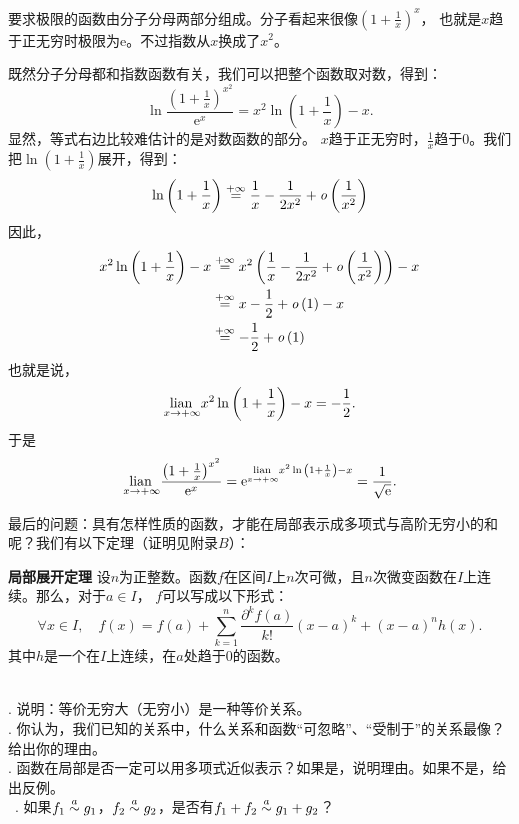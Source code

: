 \documentclass[12pt,UTF8]{ctexbook}
\begin{document}
\begin{so}
    要求极限的函数由分子分母两部分组成。分子看起来很像$\left(1 + \frac{1}{x}\right)^{x}$，
    也就是$x$趋于正无穷时极限为$\mathrm{e}$。不过指数从$x$换成了$x^2$。

    既然分子分母都和指数函数有关，我们可以把整个函数取对数，得到：
    $$ \ln{\frac{\left(1 + \frac{1}{x}\right)^{x^2}}{\mathrm{e}^x}} = x^2 \ln{\left(1 + \frac{1}{x}\right)} - x.$$
    显然，等式右边比较难估计的是对数函数的部分。
    $x$趋于正无穷时，$\frac{1}{x}$趋于$0$。我们把$\ln{\left(1 + \frac{1}{x}\right)}$展开，得到：
    $$ \ln{\left(1 + \frac{1}{x}\right)} \overset{+\infty}{=} \frac{1}{x} - \frac{1}{2x^2} + \mathit{o}\left(\frac{1}{x^2}\right)$$
    因此，
    \begin{align*}
        x^2 \ln{\left(1 + \frac{1}{x}\right)} - x &\overset{+\infty}{=} x^2 \left(\frac{1}{x} - \frac{1}{2x^2} + \mathit{o}\left(\frac{1}{x^2}\right)\right) - x  \\
        &\overset{+\infty}{=} x -\frac{1}{2} + \mathit{o}\left(1\right) - x  \\
        &\overset{+\infty}{=} -\frac{1}{2} + \mathit{o}\left(1\right) 
    \end{align*}
    也就是说，
    $$ \underset{x\to +\infty}{\operatorname{lian}\,} x^2 \ln{\left(1 + \frac{1}{x}\right)} - x = -\frac{1}{2}. $$
    于是
    $$ \underset{x\to +\infty}{\operatorname{lian}\,} \frac{\left(1 + \frac{1}{x}\right)^{x^2}}{\mathrm{e}^x} = \mathrm{e}^{\underset{x\to +\infty}{\operatorname{lian}\,}  x^2 \ln{\left(1 + \frac{1}{x}\right)} - x} = \frac{1}{\sqrt{\mathrm{e}}}. $$
\end{so}

最后的问题：具有怎样性质的函数，才能在局部表示成多项式与高阶无穷小的和呢？我们有以下定理（证明见附录$B$）：
\begin{tm}{\textbf{局部展开定理}}
    设$n$为正整数。函数$f$在区间$I$上$n$次可微，且$n$次微变函数在$I$上连续。那么，对于$a\in I$，
    $f$可以写成以下形式：
    $$ \forall x \in I , \quad f(x) = f(a) + \sum_{k=1}^n \frac{\partial^k f (a)}{k!}(x - a)^k + (x - a)^n h(x). $$
    其中$h$是一个在$I$上连续，在$a$处趋于$0$的函数。
\end{tm}

\begin{sk}
    \mbox{} \\
    . 说明：等价无穷大（无穷小）是一种等价关系。\\
    . 你认为，我们已知的关系中，什么关系和函数“可忽略”、“受制于”的关系最像？给出你的理由。\\
    . 函数在局部是否一定可以用多项式近似表示？如果是，说明理由。如果不是，给出反例。\\\
    . 如果$f_1 \overset{a}{\sim} g_1$，$f_2\overset{a}{\sim} g_2$，是否有$f_1 + f_2\overset{a}{\sim} g_1 + g_2$？
\end{sk}
\end{document}
